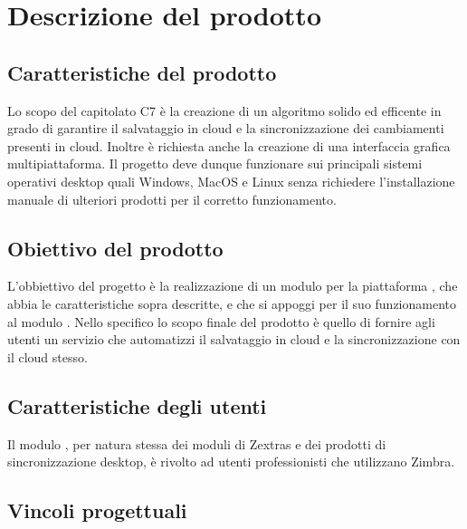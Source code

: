 \section{Descrizione del prodotto}
\subsection{Caratteristiche del prodotto}
Lo scopo del capitolato C7 è la creazione di un algoritmo solido ed efficente in grado di garantire il salvataggio in cloud e la sincronizzazione dei cambiamenti presenti in cloud. Inoltre è richiesta anche la creazione di una interfaccia grafica multipiattaforma. Il progetto deve dunque funzionare sui principali sistemi operativi desktop quali Windows, MacOS e Linux senza richiedere l'installazione manuale di ulteriori prodotti per il corretto funzionamento. 
\subsection{Obiettivo del prodotto}
L'obbiettivo del progetto è la realizzazione di un modulo per la piattaforma , che abbia le caratteristiche sopra descritte, e che si appoggi per il suo funzionamento al modulo .
Nello specifico lo scopo finale del prodotto è quello di fornire agli utenti un servizio che automatizzi il salvataggio in cloud e la sincronizzazione con il cloud stesso.
\subsection{Caratteristiche degli utenti}
Il modulo \progetto{}, per natura stessa dei moduli di Zextras e dei prodotti di sincronizzazione desktop, è rivolto ad utenti professionisti che utilizzano Zimbra. 
\subsection{Vincoli progettuali}